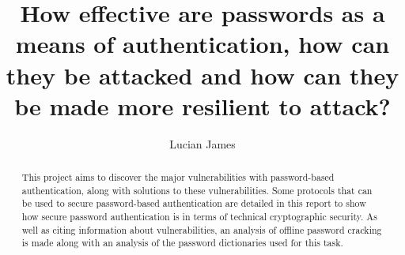 \documentclass[11pt]{article}
\title{How effective are passwords as a means of authentication, how can they be attacked and how can they be made more resilient to attack?}
\author{Lucian James}
\begin{document}
\maketitle
\begin{abstract}
This project aims to discover the major vulnerabilities with password-based authentication, along with solutions to these vulnerabilities.
Some protocols that can be used to secure password-based authentication are detailed in this report to show how secure password authentication is in terms of technical cryptographic security.
As well as citing information about vulnerabilities, an analysis of offline password cracking is made along with an analysis of the password dictionaries used for this task.
\end{abstract}
\end{document}
